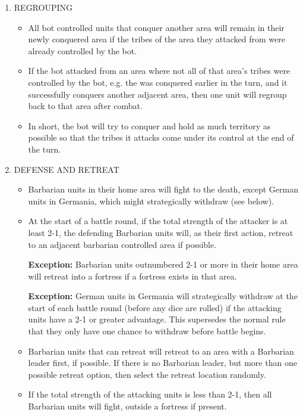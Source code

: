 \begin{enumerate}
  \item REGROUPING
  \begin{itemize}
    \item All bot controlled units that conquer another area will remain in their newly conquered area if the tribes of the area they attacked from were already controlled by the bot.
    
    \item If the bot attacked from an area where not all of that area's tribes were controlled by the bot, e.g. the was conquered earlier in the turn, and it successfully conquers another adjacent area, then one unit will regroup back to that area after combat.
    
    \item In short, the bot will try to conquer and hold as much territory as possible so that the tribes it attacks come under its control at the end of the turn.
  \end{itemize}
  
  \item DEFENSE AND RETREAT
  \begin{itemize}
    \item Barbarian units in their home area will fight to the death, except German units in Germania, which might strategically withdraw (see below).
    \item At the start of a battle round, if the total strength of the attacker is at least 2-1, the defending Barbarian units will, as their first action, retreat to an adjacent barbarian controlled area if possible.
    
    \textbf{Exception:} Barbarian units outnumbered 2-1 or more in their home area will retreat into a fortress if a fortress exists in that area.
    
    \textbf{Exception:} German units in Germania will strategically withdraw at the start of each battle round (before any dice are rolled) if the attacking units have a 2-1 or greater advantage. This supersedes the normal rule that they only have one chance to withdraw before battle begins.
    \item Barbarian units that can retreat will retreat to an area with a Barbarian leader first, if possible. If there is no Barbarian leader, but more than one possible retreat option, then select the retreat location randomly.
    \item If the total strength of the attacking units is less than 2-1, then all Barbarian units will fight, outside a fortress if present.
  \end{itemize}
\end{enumerate}

